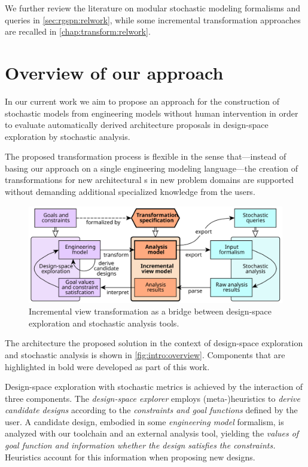We further review the literature on modular stochastic modeling formalisms and queries in \vref{sec:rgspn:relwork}, while some incremental transformation approaches are recalled in \vref{chap:transform:relwork}.

\section{Overview of our approach}
\label{sec:intro:approach}

In our current work we aim to propose an approach for the construction of stochastic models from engineering models without human intervention in order to evaluate automatically derived architecture proposals in design-space exploration by stochastic analysis.

The proposed transformation process is flexible in the sense that---instead of basing our approach on a single engineering modeling language---the creation of transformations for new architectural s in new problem domains are supported without demanding additional specialized knowledge from the users.

\begin{figure}
  \centering
  \includegraphics[scale=0.9]{figures/overview}
  \caption{Incremental view transformation as a bridge between design-space exploration and stochastic analysis tools.}
  \label{fig:intro:overview}
\end{figure}

The architecture the proposed solution in the context of design-space exploration and stochastic analysis is shown in \vref{fig:intro:overview}. Components that are highlighted in bold were developed as part of this work.

Design-space exploration with stochastic metrics is achieved by the interaction of three components. The \emph{design-space explorer} employs (meta-)heuristics to \emph{derive candidate designs} according to the \emph{constraints and goal functions} defined by the user. A candidate design, embodied in some \emph{engineering model} formalism, is analyzed with our toolchain and an external analysis tool, yielding the \emph{values of goal function and information whether the design satisfies the constraints.} Heuristics account for this information when proposing new designs.

